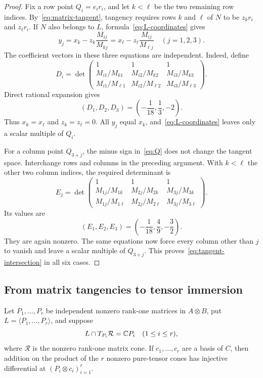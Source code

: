 \begin{proof}
Fix a row point $Q_i=e_i r_i$, and let $k<\ell$ be the two remaining
row indices. By~\eqref{eq:matrix-tangent}, tangency requires rows
$k$ and $\ell$ of $N$ to be $z_k r_i$ and $z_\ell r_i$.
If $N$ also belongs to $L$, formula~\eqref{eq:L-coordinates} gives
\[
 y_j=x_k-z_k\frac{M_{ij}}{M_{kj}}
     =x_\ell-z_\ell\frac{M_{ij}}{M_{\ell j}}
       \quad(j=1,2,3).
\]
The coefficient vectors in these three equations are independent.
Indeed, define
\[
 D_i=\det\begin{pmatrix}
 1&1&1\\
 M_{i1}/M_{k1}&M_{i2}/M_{k2}&M_{i3}/M_{k3}\\
 M_{i1}/M_{\ell1}&M_{i2}/M_{\ell2}&M_{i3}/M_{\ell3}
 \end{pmatrix}.
\]
Direct rational expansion gives
\begin{equation}\label{eq:row-determinants}
 (D_1,D_2,D_3)=\left(-\frac1{18},\frac13,-2\right).
\end{equation}
Thus $x_k=x_\ell$ and $z_k=z_\ell=0$. All $y_j$ equal $x_k$,
and~\eqref{eq:L-coordinates} leaves only a scalar multiple of $Q_i$.

For a column point $Q_{3+j}$, the minus sign in~\eqref{eq:Q} does
not change the tangent space. Interchange rows and columns in the
preceding argument. With $k<\ell$ the other two column indices,
the required determinant is
\[
 E_j=\det\begin{pmatrix}
 1&1&1\\
 M_{1j}/M_{1k}&M_{2j}/M_{2k}&M_{3j}/M_{3k}\\
 M_{1j}/M_{1\ell}&M_{2j}/M_{2\ell}&M_{3j}/M_{3\ell}
 \end{pmatrix}.
\]
Its values are
\begin{equation}\label{eq:column-determinants}
 (E_1,E_2,E_3)=\left(-\frac1{18},\frac49,-\frac32\right).
\end{equation}
They are again nonzero. The same equations now force every column
other than $j$ to vanish and leave a scalar multiple of $Q_{3+j}$.
This proves~\eqref{eq:tangent-intersection} in all six cases.
\end{proof}


\subsection{From matrix tangencies to tensor immersion}

\begin{lemma}\label{lemma:tangent-criterion}
Let $P_1,\ldots,P_r$ be independent nonzero rank-one matrices in
$A\otimes B$, put $L=\langle P_1,\ldots,P_r\rangle$, and suppose
\[
 L\cap T_{P_i}\mathcal R=\mathbb C P_i\quad(1\leq i\leq r),
\]
where $\mathcal R$ is the nonzero rank-one matrix cone.
If $c_1,\ldots,c_r$ are a basis of $C$, then addition on the product
of the $r$ nonzero pure-tensor cones has injective differential at
$(P_i\otimes c_i)_{i=1}^r$.
\end{lemma}

